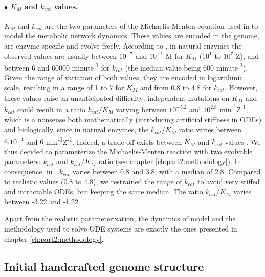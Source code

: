 \paragraph{$\bullet$ $K_M$ and $k_{cat}$ values.} 
$K_M$ and $k_{cat}$ are the two parameters of the Michaelis-Menten equation used in {\EvoEvoSim} to model the metabolic network dynamics. These values are encoded in the genome, are enzyme-specific and evolve freely. According to \cite{bar-even-et-al-2011}, in natural enzymes the observed values are usually between $10^{-7}$ and $10^{-1}$ M for $K_M$ ($10^1$ to $10^7$ Z), and between 6 and 60000 minute\textsuperscript{-1} for $k_{cat}$ (the median value being 600 minute\textsuperscript{-1}). Given the range of variation of both values, they are encoded in logarithmic scale, resulting in a range of 1 to 7 for $K_M$ and from 0.8 to 4.8 for $k_{cat}$.
However, these values raise an unanticipated difficulty: independent mutations on $K_M$ and $k_{cat}$ could result in a ratio $k_{cat}/K_M$ varying between $10^{-5.2}$ and $10^{2.8}$ min\textsuperscript{-1}Z\textsuperscript{-1}, which is a nonsense both mathematically (introducing artificial stiffness in ODEs) and biologically, since in natural enzymes, the $k_{cat}/K_M$ ratio varies between $6.10^{-4}$ and $6$ min\textsuperscript{-1}Z\textsuperscript{-1}. Indeed, a trade-off exists between $K_M$ and $k_{cat}$ values \citep{bar-even-et-al-2011}. We thus decided to parameterize the Michaelis-Menten reaction with two evolvable parameters: $k_{cat}$ and $k_{cat}/K_M$ ratio (see chapter \ref{ch:part2:methodology}). In consequence, in {\EvoEvoSim}, $k_{cat}$ varies between 0.8 and 3.8, with a median of 2.8. Compared to realistic values (0.8 to 4.8), we restrained the range of $k_{cat}$ to avoid very stiffed and intractable ODEs, but keeping the same median. The ratio $k_{cat}/K_M$ varies between -3.22 and -1.22.

Apart from the realistic parameterization, the dynamics of {\EvoEvoSim} model and the methodology used to solve ODE systems are exactly the ones presented in chapter \ref{ch:part2:methodology}. 


\subsection{Initial handcrafted genome structure}
\label{subsec:part2:second_result:initial_genome_stucture}

